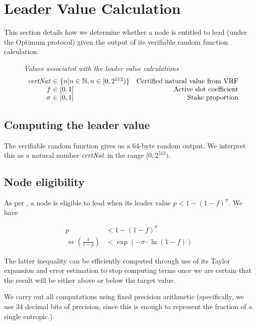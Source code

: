 \section{Leader Value Calculation}
\label{sec:leader-value-calc}

This section details how we determine whether a node is entitled to lead (under
the Optimum protocol) given the output of its verifiable random function
calculation.

\begin{figure}
  \emph{Values associated with the leader value calculations}
  \begin{equation*}
  \begin{array}{r@{~\in~}lr}
    \var{certNat} & \{n | n \in \N, n \in [0,2^{512})\} & \text{Certified natural value from VRF} \\
    \var{f} & [0,1] & \text{Active slot coefficient} \\
    \sigma & [0,1] & \text{Stake proportion}
  \end{array}
  \end{equation*}
\end{figure}

\subsection{Computing the leader value}

The verifiable random function gives us a 64-byte random output. We interpret
this as a natural number $\mathit{certNat}$ in the range $[0,2^{512})$.

\subsection{Node eligibility}

As per \cite{shardagnostic_optimum}, a node is eligible to lead when its leader value
$p < 1 - (1 - f)^\sigma$. We have

\begin{align*}
  p & < 1 - (1 -f)^\sigma \\
  \iff \left(\frac{1}{1-p}\right) & < \exp{(-\sigma \cdot \ln{(1-f)})}
\end{align*}

The latter inequality can be efficiently computed through use of its Taylor
expansion and error estimation to stop computing terms once we are certain that
the result will be either above or below the target value.

We carry out all computations using fixed precision arithmetic (specifically, we
use 34 decimal bits of precision, since this is enough to represent the fraction
of a single entropic.)

